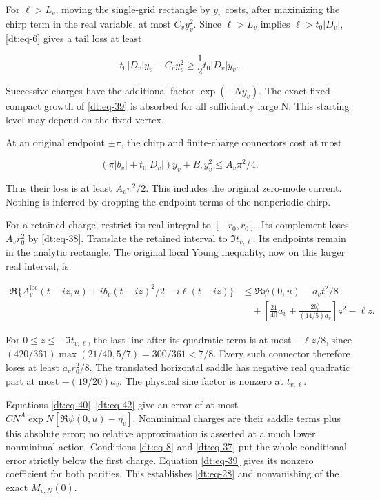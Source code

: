 For \(\ell>L_v\), moving the single-grid rectangle by \(y_v\) costs, after
maximizing the chirp term in the real variable, at most \(C_v y_v^2\).
Since \(\ell>L_v\) implies \(\ell>t_0|D_v|\), \eqref{dt:eq-6} gives a tail loss at least

\begin{equation}\label{dt:eq-40}
t_0|D_v|y_v-C_vy_v^2\ge\frac12t_0|D_v|y_v.
\end{equation}

Successive charges have the additional factor \(\exp(-Ny_v)\). The exact
fixed-compact growth of \eqref{dt:eq-39} is absorbed for all sufficiently large N.
This starting level may depend on the fixed vertex.

At an original endpoint \(\pm\pi\), the chirp and finite-charge connectors cost
at most

\begin{equation}\label{dt:eq-41}
(\pi|b_v|+t_0|D_v|)y_v+B_vy_v^2
                            \le A_v\pi^2/4.
\end{equation}

Thus their loss is at least \(A_v\pi^2/2\). This includes the original
zero-mode current. Nothing is inferred by dropping the endpoint terms
of the nonperiodic chirp.

For a retained charge, restrict its real integral to \([-r_0,r_0]\).
Its complement loses \(A_vr_0^2\) by \eqref{dt:eq-38}. Translate the retained interval
to \(\Im t_{v,\ell}\). Its endpoints remain in the analytic rectangle. The
original local Young inequality, now on this larger real interval,
is

\begin{equation}\label{dt:eq-42}
\begin{aligned}
 \Re\{A_v^{\mathrm{loc}}(t-iz,u)+ib_v(t-iz)^2/2-i\ell(t-iz)\}
 &\le\Re\psi(0,u)-a_vt^2/8\\
 &\quad+\left[\frac{21}{40}a_v+
                 \frac{2b_v^2}{(14/5)a_v}\right]z^2-\ell z.
\end{aligned}
\end{equation}

For \(0\le z\le-\Im t_{v,\ell}\), the last line after its quadratic term is
at most \(-\ell z/8\), since \((420/361)\max(21/40,5/7)=300/361<7/8\).
Every such connector therefore loses at least \(a_vr_0^2/8\).
The translated horizontal saddle has negative real quadratic part
at most \(-(19/20)a_v\). The physical sine factor is nonzero at \(t_{v,\ell}\).

Equations \eqref{dt:eq-40}--\eqref{dt:eq-42} give an error of at most
\(CN^A\exp N[\Re\psi(0,u)-\eta_v]\). Nonminimal charges are their saddle
terms plus this absolute error; no relative approximation is asserted
at a much lower nonminimal action. Conditions \eqref{dt:eq-8} and \eqref{dt:eq-37} put the
whole conditional error strictly below the first charge. Equation
\eqref{dt:eq-39} gives its nonzero coefficient for both parities. This establishes
\eqref{dt:eq-28} and nonvanishing of the exact \(M_{v,N}(0)\).

